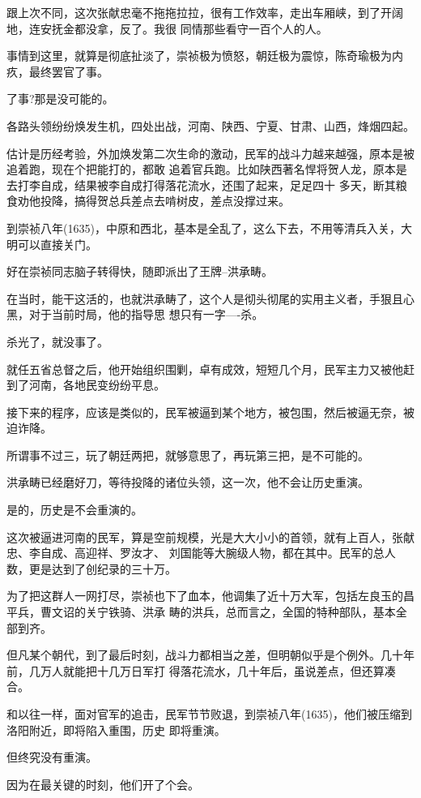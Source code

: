 \documentclass[11pt,a4paper,onecolumn]{article}
\begin{document}
跟上次不同，这次张献忠毫不拖拖拉拉，很有工作效率，走出车厢峡，到了开阔地，连安抚金都没拿，反了。我很
同情那些看守一百个人的人。

事情到这里，就算是彻底扯淡了，崇祯极为愤怒，朝廷极为震惊，陈奇瑜极为内疚，最终罢官了事。

了事?那是没可能的。

各路头领纷纷焕发生机，四处出战，河南、陕西、宁夏、甘肃、山西，烽烟四起。

估计是历经考验，外加焕发第二次生命的激动，民军的战斗力越来越强，原本是被追着跑，现在个把能打的，都敢
追着官兵跑。比如陕西著名悍将贺人龙，原本是去打李自成，结果被李自成打得落花流水，还围了起来，足足四十
多天，断其粮食劝他投降，搞得贺总兵差点去啃树皮，差点没撑过来。

到崇祯八年(1635)，中原和西北，基本是全乱了，这么下去，不用等清兵入关，大明可以直接关门。

好在崇祯同志脑子转得快，随即派出了王牌--洪承畴。

在当时，能干这活的，也就洪承畴了，这个人是彻头彻尾的实用主义者，手狠且心黑，对于当前时局，他的指导思
想只有一字----杀。

杀光了，就没事了。

就任五省总督之后，他开始组织围剿，卓有成效，短短几个月，民军主力又被他赶到了河南，各地民变纷纷平息。

接下来的程序，应该是类似的，民军被逼到某个地方，被包围，然后被逼无奈，被迫诈降。

所谓事不过三，玩了朝廷两把，就够意思了，再玩第三把，是不可能的。

洪承畴已经磨好刀，等待投降的诸位头领，这一次，他不会让历史重演。

是的，历史是不会重演的。

这次被逼进河南的民军，算是空前规模，光是大大小小的首领，就有上百人，张献忠、李自成、高迎祥、罗汝才、
刘国能等大腕级人物，都在其中。民军的总人数，更是达到了创纪录的三十万。

为了把这群人一网打尽，崇祯也下了血本，他调集了近十万大军，包括左良玉的昌平兵，曹文诏的关宁铁骑、洪承
畴的洪兵，总而言之，全国的特种部队，基本全部到齐。

但凡某个朝代，到了最后时刻，战斗力都相当之差，但明朝似乎是个例外。几十年前，几万人就能把十几万日军打
得落花流水，几十年后，虽说差点，但还算凑合。

和以往一样，面对官军的追击，民军节节败退，到崇祯八年(1635)，他们被压缩到洛阳附近，即将陷入重围，历史
即将重演。

但终究没有重演。

因为在最关键的时刻，他们开了个会。
\end{document}
